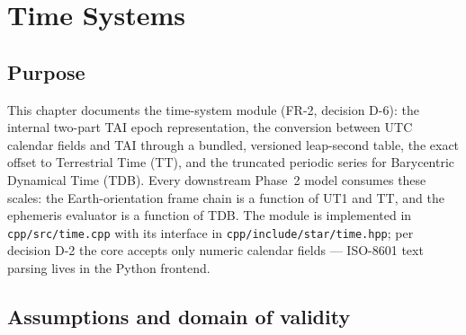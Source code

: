 \chapter{Time Systems}
\label{ch:time}

\section{Purpose}
\label{sec:time:purpose}

This chapter documents the time-system module (FR-2, decision D-6): the
internal two-part TAI epoch representation, the conversion between UTC
calendar fields and TAI through a bundled, versioned leap-second table, the
exact offset to Terrestrial Time (TT), and the truncated periodic series for
Barycentric Dynamical Time (TDB). Every downstream Phase~2 model consumes
these scales: the Earth-orientation frame chain is a function of UT1 and TT,
and the ephemeris evaluator is a function of TDB. The module is implemented
in \texttt{cpp/src/time.cpp} with its interface in
\texttt{cpp/include/star/time.hpp}; per decision D-2 the core accepts only
numeric calendar fields --- ISO-8601 text parsing lives in the Python
frontend.

\section{Assumptions and domain of validity}
\label{sec:time:domain}

